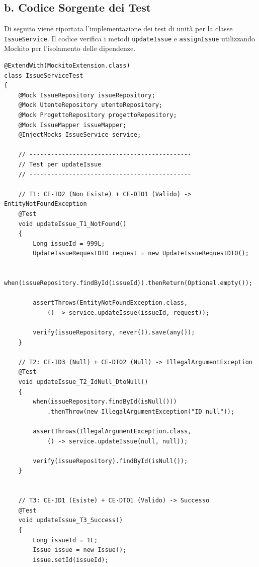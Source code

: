 \documentclass[a4paper,12pt]{article}
\begin{document}
\subsection*{b. Codice Sorgente dei Test}
{}
Di seguito viene riportata l'implementazione dei test di unità per la classe \texttt{IssueService}. Il codice verifica i metodi \texttt{updateIssue} e \texttt{assignIssue} utilizzando Mockito per l'isolamento delle dipendenze.

\begin{tcolorbox}[
    enhanced,
    colback=white,
    colframe=UninaBlue,
    boxrule=0.8pt,
    arc=3pt,
    title=IssueServiceTest.java,
    fonttitle=\bfseries\small,
    coltitle=white,
    breakable
]
\begin{verbatim}
@ExtendWith(MockitoExtension.class)
class IssueServiceTest
{
    @Mock IssueRepository issueRepository;
    @Mock UtenteRepository utenteRepository;
    @Mock ProgettoRepository progettoRepository;
    @Mock IssueMapper issueMapper;
    @InjectMocks IssueService service;

    // ---------------------------------------------
    // Test per updateIssue
    // ---------------------------------------------

    // T1: CE-ID2 (Non Esiste) + CE-DTO1 (Valido) -> EntityNotFoundException
    @Test
    void updateIssue_T1_NotFound()
    {
        Long issueId = 999L;
        UpdateIssueRequestDTO request = new UpdateIssueRequestDTO();

        when(issueRepository.findById(issueId)).thenReturn(Optional.empty());

        assertThrows(EntityNotFoundException.class, 
            () -> service.updateIssue(issueId, request));

        verify(issueRepository, never()).save(any());
    }

    // T2: CE-ID3 (Null) + CE-DTO2 (Null) -> IllegalArgumentException
    @Test
    void updateIssue_T2_IdNull_DtoNull()
    {
        when(issueRepository.findById(isNull()))
            .thenThrow(new IllegalArgumentException("ID null"));

        assertThrows(IllegalArgumentException.class, 
            () -> service.updateIssue(null, null));

        verify(issueRepository).findById(isNull());
    }


    // T3: CE-ID1 (Esiste) + CE-DTO1 (Valido) -> Successo
    @Test
    void updateIssue_T3_Success()
    {
        Long issueId = 1L;
        Issue issue = new Issue();
        issue.setId(issueId);


\end{verbatim}
\end{tcolorbox}
\end{document}
